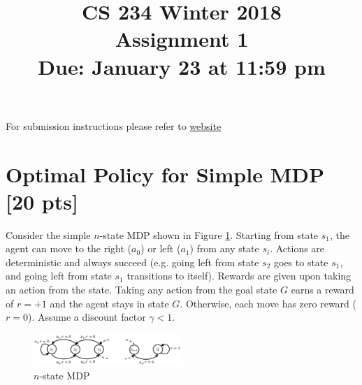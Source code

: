 \documentclass[11pt]{article}
\title{CS 234 Winter 2018 \\ Assignment 1 \\ Due: January 23 at 11:59 pm}
\date{}
\begin{document}
	\maketitle
\noindent For submission instructions please refer to \href{http://web.stanford.edu/class/cs234/assignments.html}{website}

\section{Optimal Policy for Simple MDP [20 pts]}

Consider the simple $n$-state MDP shown in Figure \ref{fig:Q1}. Starting from state $s_1$, the agent can move to the right ($a_0$) or left ($a_1$) from any state $s_i$. Actions are deterministic and always succeed (e.g. going left from
state $s_2$ goes to state $s_1$, and going left from state $s_1$ transitions to itself). Rewards are given upon taking an action from the state. Taking any action from the goal state $G$ earns a reward of $r=+1$
and the agent stays in state $G$. Otherwise, each move has zero reward ($r=0$). Assume a discount factor $\gamma < 1$.

\begin{figure}[h]
  \centering
    \includegraphics[width=0.5\textwidth]{Q1.pdf}
    \caption{$n$-state MDP}
  	\label{fig:Q1}
\end{figure}
\end{document}
